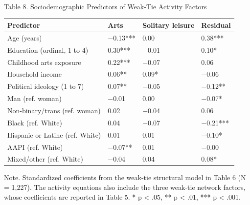 \documentclass[
  12pt
]{article}
\begin{document}
Table 8. Sociodemographic Predictors of Weak-Tie Activity Factors

\begin{tabular*}{\textwidth}{@{\extracolsep{\fill}}>{\raggedright\arraybackslash}p{} >{\raggedleft\arraybackslash}p{} >{\raggedleft\arraybackslash}p{} >{\raggedleft\arraybackslash}p{}@{}}
\toprule
Predictor & Arts & Solitary leisure & Residual \\
\midrule
Age (years) & $-$0.13***\hphantom{} & \hphantom{$-$}0.00\hphantom{***} & \hphantom{$-$}0.38***\hphantom{} \\
Education (ordinal, 1 to 4) & \hphantom{$-$}0.30***\hphantom{} & $-$0.01\hphantom{***} & \hphantom{$-$}0.10*\hphantom{**} \\
Childhood arts exposure & \hphantom{$-$}0.22***\hphantom{} & $-$0.07\hphantom{***} & \hphantom{$-$}0.06\hphantom{***} \\
Household income & \hphantom{$-$}0.06**\hphantom{*} & \hphantom{$-$}0.09*\hphantom{**} & $-$0.06\hphantom{***} \\
Political ideology (1 to 7) & \hphantom{$-$}0.07**\hphantom{*} & $-$0.05\hphantom{***} & $-$0.12**\hphantom{*} \\
Man (ref. woman) & $-$0.01\hphantom{***} & \hphantom{$-$}0.00\hphantom{***} & $-$0.07*\hphantom{**} \\
Non-binary/trans (ref. woman) & \hphantom{$-$}0.02\hphantom{***} & $-$0.04\hphantom{***} & \hphantom{$-$}0.06\hphantom{***} \\
Black (ref. White) & \hphantom{$-$}0.04\hphantom{***} & $-$0.07\hphantom{***} & $-$0.21***\hphantom{} \\
Hispanic or Latine (ref. White) & \hphantom{$-$}0.01\hphantom{***} & \hphantom{$-$}0.01\hphantom{***} & $-$0.10*\hphantom{**} \\
AAPI (ref. White) & $-$0.07**\hphantom{*} & \hphantom{$-$}0.01\hphantom{***} & $-$0.00\hphantom{***} \\
Mixed/other (ref. White) & $-$0.04\hphantom{***} & \hphantom{$-$}0.04\hphantom{***} & \hphantom{$-$}0.08*\hphantom{**} \\
\bottomrule
\end{tabular*}

Note. Standardized coefficients from the weak-tie structural model in Table 6 (N = 1,227). The activity equations also include the three weak-tie network factors, whose coefficients are reported in Table 5. * p < .05, ** p < .01, *** p < .001.
\end{document}
